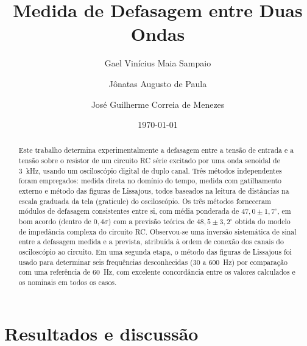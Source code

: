 \documentclass[reprint,amsmath,amssymb,aps,prl,floatfix,onecolumn]{revtex4-2}
\begin{document}


\title{Medida de Defasagem entre Duas Ondas}

\author{Gael Vinícius Maia Sampaio}
\author{Jônatas Augusto de Paula}
\author{José Guilherme Correia de Menezes}

\date{\today}

\begin{abstract}
Este trabalho determina experimentalmente a defasagem entre a tensão de entrada e a tensão sobre o resistor de um circuito RC série excitado por uma onda senoidal de 3~kHz, usando um osciloscópio digital de duplo canal. Três métodos independentes foram empregados: medida direta no domínio do tempo, medida com gatilhamento externo e método das figuras de Lissajous, todos baseados na leitura de distâncias na escala graduada da tela (graticule) do osciloscópio. Os três métodos forneceram módulos de defasagem consistentes entre si, com média ponderada de $47{,}0\pm1{,}7^\circ$, em bom acordo (dentro de $0{,}4\sigma$) com a previsão teórica de $48{,}5\pm3{,}2^\circ$ obtida do modelo de impedância complexa do circuito RC. Observou-se uma inversão sistemática de sinal entre a defasagem medida e a prevista, atribuída à ordem de conexão dos canais do osciloscópio ao circuito. Em uma segunda etapa, o método das figuras de Lissajous foi usado para determinar seis frequências desconhecidas (30 a 600~Hz) por comparação com uma referência de 60~Hz, com excelente concordância entre os valores calculados e os nominais em todos os casos.
\end{abstract}

\maketitle

\section{Resultados e discussão}
\end{document}
